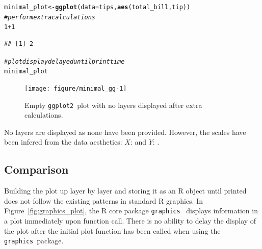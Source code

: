 \documentclass[stat,dissertation]{puthesis}\usepackage[]{graphicx}\usepackage{xcolor}
\makeatletter
\newcommand{\hlnum}[1]{\textcolor[rgb]{0.686,0.059,0.569}{#1}}%
\newcommand{\hlcom}[1]{\textcolor[rgb]{0.678,0.584,0.686}{\textit{#1}}}%
\newcommand{\hlopt}[1]{\textcolor[rgb]{0,0,0}{#1}}%
\newcommand{\hlstd}[1]{\textcolor[rgb]{0.345,0.345,0.345}{#1}}%
\newcommand{\hlkwb}[1]{\textcolor[rgb]{0.69,0.353,0.396}{#1}}%
\newcommand{\hlkwc}[1]{\textcolor[rgb]{0.333,0.667,0.333}{#1}}%
\newcommand{\hlkwd}[1]{\textcolor[rgb]{0.737,0.353,0.396}{\textbf{#1}}}%
\newenvironment{kframe}{%
 \def\at@end@of@kframe{}%
 \ifinner\ifhmode%
  \def\at@end@of@kframe{\end{minipage}}%
  \begin{minipage}{\columnwidth}%
 \fi\fi%
 \def\FrameCommand##1{\hskip\@totalleftmargin \hskip-\fboxsep
 \colorbox{shadecolor}{##1}\hskip-\fboxsep
     \hskip-\linewidth \hskip-\@totalleftmargin \hskip\columnwidth}%
 \MakeFramed {\advance\hsize-\width
   \@totalleftmargin\z@ \linewidth\hsize
   \@setminipage}}%
 {\par\unskip\endMakeFramed%
 \at@end@of@kframe}
\newenvironment{knitrout}{}{} %
\renewenvironment{knitrout}{\setstretch{1}}{}
\newcommand{\pkg}[1]{\texttt{#1}}
\newcommand{\ggplot}{\pkg{ggplot2}}
\makeatother
\begin{document}
\begin{knitrout}\small
{}\color{fgcolor}\begin{kframe}
\begin{alltt}
\hlstd{minimal_plot} \hlkwb{<-} \hlkwd{ggplot}\hlstd{(}\hlkwc{data} \hlstd{= tips,} \hlkwd{aes}\hlstd{(total_bill, tip))}
\hlcom{# perform extra calculations}
\hlnum{1} \hlopt{+} \hlnum{1}
\end{alltt}
\begin{verbatim}
## [1] 2
\end{verbatim}
\begin{alltt}
\hlcom{# plot display delayed until print time}
\hlstd{minimal_plot}
\end{alltt}
\end{kframe}\begin{figure}[H]

{\centering \texttt{[image: figure/minimal\_gg-1]} 

}

\caption{Empty \ggplot~plot with no layers displayed after extra calculations.}\label{fig:minimal_gg}
\end{figure}


\end{knitrout}

No layers are displayed as none have been provided.  However, the scales have been infered from the data aesthetics: $X$:  and $Y$: .

\subsection{Comparison}

Building the plot up layer by layer and storing it as an R object until printed does not follow the existing patterns in standard R graphics.  In Figure~\ref{fig:graphics_plot}, the R core package \pkg{graphics}~\cite{r_project} displays information in a plot immediately upon function call.  There is no ability to delay the display of the plot after the initial plot function has been called when using the \pkg{graphics}~package.
\end{document}
